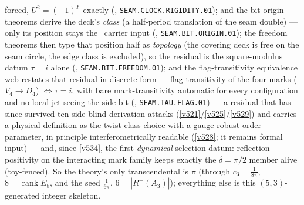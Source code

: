 \documentclass[11pt,a4paper]{article}
\newcommand{\gcar}{g_{\mathrm{car}}}
\newcommand{\Nfam}{N_{\mathrm{fam}}}
\newcommand{\cthree}{c_3}
\theoremstyle{definition}
\begin{document}
\begin{keybox}[The whole integer skeleton from one pair $(\gcar,\Nfam)=(5,3)$ \mE\ (\veri{v53\_compiler\_core.py})]
forced, $U^2=(-1)^F$ exactly (, \texttt{SEAM.CLOCK.RIGIDITY.01});
and the bit-origin theorems derive the deck's \emph{class} (a half-period translation of the seam
double) --- only its position stays the \mC\ carrier input
(, \texttt{SEAM.BIT.ORIGIN.01}); the freedom theorems then type
that position half as \emph{topology} (the covering deck is free on the seam circle, the edge class
is excluded), so the residual is the square-modulus datum $\tau=i$ alone
(, \texttt{SEAM.BIT.FREEDOM.01}); and the flag-transitivity
equivalence web restates that residual in discrete form --- flag transitivity of the four marks
($V_4\to D_4$) $\iff\tau=i$, with bare mark-transitivity automatic for every configuration and no
local jet seeing the side bit (, \texttt{SEAM.TAU.FLAG.01}) ---
a residual that has since survived ten side-blind derivation attacks
(\vref{v521}/\vref{v525}/\vref{v529}) and carries a physical definition as the twist-class
choice with a gauge-robust order parameter, in principle interferometrically readable
(\vref{v528}; it remains formal input) --- and, since \vref{v534}, the first \emph{dynamical}
selection datum: reflection positivity on the interacting mark family keeps exactly the
$\delta=\pi/2$ member alive (toy-fenced).
So the theory's only transcendental is $\pi$ (through
$\cthree=\tfrac1{8\pi}$, $8=\operatorname{rank}E_8$, and the seed $\tfrac1{6\pi}$, $6=|R^+(A_3)|$);
everything else is this $(5,3)$-generated integer skeleton.
\end{keybox}
\end{document}
